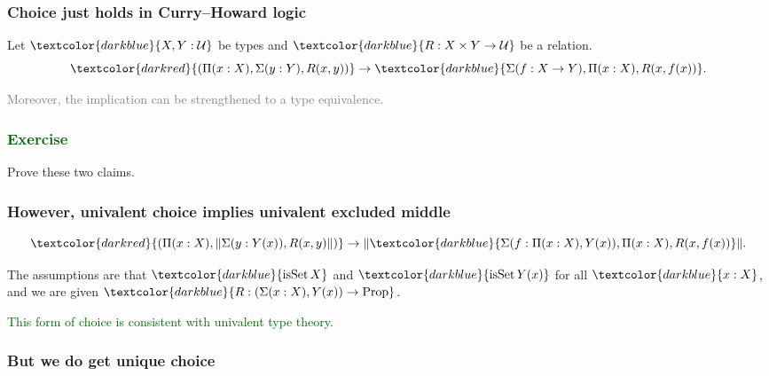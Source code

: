 \documentclass[aspectratio=169]{beamer}
\newcommand{\Prop}{\operatorname{Prop}}
\newcommand{\isSet}{\operatorname{isSet}}
\newcommand{\U}{\operatorname{\mathcal{U}}}
\newcommand{\db}{\textcolor{darkblue}}
\newcommand{\dg}{\textcolor{darkgreen}}
\newcommand{\grey}{\textcolor{grey}}
\newcommand{\dr}{\textcolor{darkred}}
\newcommand{\m}[1]{$\db{#1}$}
\newcommand{\trunc}[1]{{\mathord{\parallel}#1\mathord{\parallel}}}
\begin{document}
\begin{frame}
  \frametitle{Choice just holds in Curry--Howard logic}

Let \m{X,Y:\U} be types and \m{R : X \times Y \to \U} be a relation.
\[
\dr{(\Pi(x:X), \Sigma(y:Y), R(x,y))} \to \db{\Sigma(f:X\to Y), \Pi(x:X), R(x,f(x))}.
\]

\vfill

\grey{Moreover, the implication can be strengthened to a type equivalence.}

\end{frame}

\begin{frame}
  \frametitle{\dg{Exercise}}

  Prove these two claims.
\end{frame}


\begin{frame}
  \frametitle{However, univalent choice implies univalent excluded middle}

\[
\dr{(\Pi(x:X), \trunc{\Sigma(y:Y(x)), R(x,y)})} \to \trunc{\db{\Sigma(f:\Pi(x:X), Y(x)), \Pi(x:X), R(x,f(x))}}.
\]

\vfill

The assumptions are that \m{\isSet{X}} and \m{\isSet{Y(x)}} for all \m{x:X}, and we are given \m{R : (\Sigma(x:X), Y(x)) \to \Prop}.

\vfill

\dg{This form of choice is consistent with univalent type theory.}


\end{frame}

\begin{frame}
  \frametitle{But we do get unique choice}
\end{frame}
\end{document}
